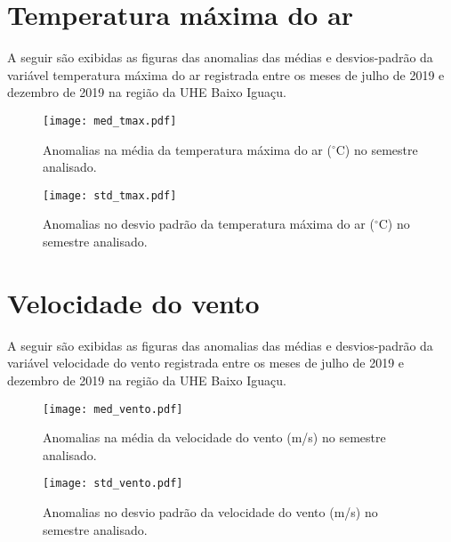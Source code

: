 \documentclass[a4paper,12pt]{article}
\begin{document}
        
        \newpage
        
        \section{Temperatura máxima do ar }
        \hspace{0.5cm} A seguir são exibidas as figuras das anomalias das médias e desvios-padrão da variável temperatura máxima do ar 
        registrada entre os meses de julho de 2019 e dezembro de 2019 na região da UHE Baixo Iguaçu.
        
        \begin{figure}[!htb]
        \centering
        \texttt{[image: med\_tmax.pdf]}
        \caption{Anomalias na média da temperatura máxima do ar ($^\circ$C) no semestre analisado.}
        \label{fig:figmed_tmax}
        \end{figure}
        
        \begin{figure}[!htb]
        \centering
        \texttt{[image: std\_tmax.pdf]}
        \caption{Anomalias no desvio padrão da temperatura máxima do ar ($^\circ$C) no semestre analisado.}
        \label{fig:figstd_tmax}
        \end{figure}  
        
        
        \newpage
        
        \section{Velocidade do vento }
        \hspace{0.5cm} A seguir são exibidas as figuras das anomalias das médias e desvios-padrão da variável velocidade do vento 
        registrada entre os meses de julho de 2019 e dezembro de 2019 na região da UHE Baixo Iguaçu.
        
        \begin{figure}[!htb]
        \centering
        \texttt{[image: med\_vento.pdf]}
        \caption{Anomalias na média da velocidade do vento (m/s) no semestre analisado.}
        \label{fig:figmed_vento}
        \end{figure}
        
        \begin{figure}[!htb]
        \centering
        \texttt{[image: std\_vento.pdf]}
        \caption{Anomalias no desvio padrão da velocidade do vento (m/s) no semestre analisado.}
        \label{fig:figstd_vento}
        \end{figure}  
        
\end{document}
